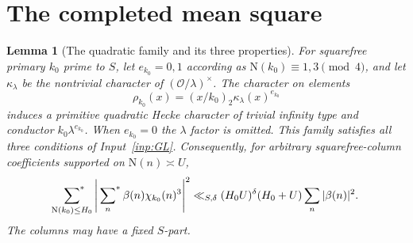 \documentclass[11pt,a4paper]{article}
\numberwithin{equation}{section}
\newtheorem{lemma}[theorem]{Lemma}
\theoremstyle{definition}
\theoremstyle{remark}
\newcommand{\OO}{\mathcal O}
\newcommand{\N}{\mathrm N}
\newcommand{\sfstar}{\sideset{}{^*}\sum}
\begin{document}
\section{The completed mean square}\label{sec:completed}
\begin{lemma}[The quadratic family and its three properties]\label{lem:GLfamily}
For squarefree primary $k_0$ prime to $S$, let $e_{k_0}=0,1$ according as $\N(k_0)\equiv1,3\pmod4$, and let $\kappa_\lambda$ be the nontrivial character of $(\OO/\lambda)^\times$. The character on elements
\[
 \rho_{k_0}(x)=(x/k_0)_2\kappa_\lambda(x)^{e_{k_0}}
\]
induces a primitive quadratic Hecke character of trivial infinity type and conductor $k_0\lambda^{e_{k_0}}$. When $e_{k_0}=0$ the $\lambda$ factor is omitted. This family satisfies all three conditions of Input~\ref{inp:GL}. Consequently, for arbitrary squarefree-column coefficients supported on $\N(n)\asymp U$,
\begin{equation}\label{eq:GLactual}
 \sfstar_{\N(k_0)\le H_0}\left|\sfstar_n\beta(n)\chi_{k_0}(n)^3\right|^2
 \ll_{S,\delta}(H_0U)^\delta(H_0+U)\sum_n|\beta(n)|^2.
\end{equation}
The columns may have a fixed $S$-part.
\end{lemma}
\end{document}
